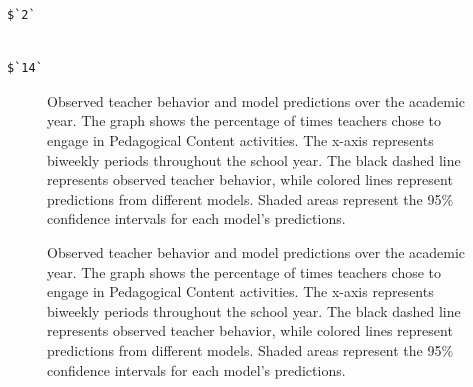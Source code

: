 \documentclass[
  number,
  preprint,
  3p,
  onecolumn]{elsarticle}
\begin{document}
\newpage{}

\begin{verbatim}
$`2`
\end{verbatim}

\begin{verbatim}

$`14`
\end{verbatim}

\begin{figure}


\caption{\label{fig-action-percentages-1}Observed teacher behavior and
model predictions over the academic year. The graph shows the percentage
of times teachers chose to engage in Pedagogical Content activities. The
x-axis represents biweekly periods throughout the school year. The black
dashed line represents observed teacher behavior, while colored lines
represent predictions from different models. Shaded areas represent the
95\% confidence intervals for each model's predictions.}

\end{figure}%

\begin{figure}


\caption{\label{fig-action-percentages-2}Observed teacher behavior and
model predictions over the academic year. The graph shows the percentage
of times teachers chose to engage in Pedagogical Content activities. The
x-axis represents biweekly periods throughout the school year. The black
dashed line represents observed teacher behavior, while colored lines
represent predictions from different models. Shaded areas represent the
95\% confidence intervals for each model's predictions.}

\end{figure}%

\newpage{}
\end{document}
